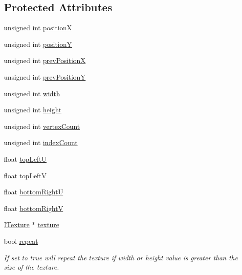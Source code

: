 \subsection*{Protected Attributes}
\begin{DoxyCompactItemize}
\item 
unsigned int \hyperlink{class_osiris_i_1_1_graphics_1_1_actors_1_1_i_sprite_ac3590fc88e070225b1c08e187c0fd023}{position\-X}
\item 
unsigned int \hyperlink{class_osiris_i_1_1_graphics_1_1_actors_1_1_i_sprite_a0164ee4755e0522e0eb4b00e427e8ce8}{position\-Y}
\item 
unsigned int \hyperlink{class_osiris_i_1_1_graphics_1_1_actors_1_1_i_sprite_a7e7d420ef96b92d1280fa680a05779cc}{prev\-Position\-X}
\item 
unsigned int \hyperlink{class_osiris_i_1_1_graphics_1_1_actors_1_1_i_sprite_afdfbeedb57afeb3cb21ec1b6d265894b}{prev\-Position\-Y}
\item 
unsigned int \hyperlink{class_osiris_i_1_1_graphics_1_1_actors_1_1_i_sprite_a4d463bbb08fdf10f2de2298467383faa}{width}
\item 
unsigned int \hyperlink{class_osiris_i_1_1_graphics_1_1_actors_1_1_i_sprite_a6d6f66e38dcd796b962c493c08bdbbff}{height}
\item 
unsigned int \hyperlink{class_osiris_i_1_1_graphics_1_1_actors_1_1_i_sprite_a438ae426c13697237a0284686d3a8481}{vertex\-Count}
\item 
unsigned int \hyperlink{class_osiris_i_1_1_graphics_1_1_actors_1_1_i_sprite_acaca77ce9bc41f058aba104b26dce537}{index\-Count}
\item 
float \hyperlink{class_osiris_i_1_1_graphics_1_1_actors_1_1_i_sprite_a13ed35d438c71402eff4f43bd062d9e1}{top\-Left\-U}
\item 
float \hyperlink{class_osiris_i_1_1_graphics_1_1_actors_1_1_i_sprite_a0103c27e0ef4b6c0117ca3f4e0c82718}{top\-Left\-V}
\item 
float \hyperlink{class_osiris_i_1_1_graphics_1_1_actors_1_1_i_sprite_a96506456d0f6507c5771cdf13693649c}{bottom\-Right\-U}
\item 
float \hyperlink{class_osiris_i_1_1_graphics_1_1_actors_1_1_i_sprite_a7e47e523291e7ed33d732e07a603b16f}{bottom\-Right\-V}
\item 
\hyperlink{class_osiris_i_1_1_graphics_1_1_actors_1_1_i_texture}{I\-Texture} $\ast$ \hyperlink{class_osiris_i_1_1_graphics_1_1_actors_1_1_i_sprite_a37a4fb8d1b7ad4d7f99ee602eac11033}{texture}
\item 
bool \hyperlink{class_osiris_i_1_1_graphics_1_1_actors_1_1_i_sprite_a0e1951b7cd86b1dc0dc96cb8342f296b}{repeat}
\begin{DoxyCompactList}\small\item\em If set to true will repeat the texture if width or height value is greater than the size of the texture. \end{DoxyCompactList}\end{DoxyCompactItemize}


